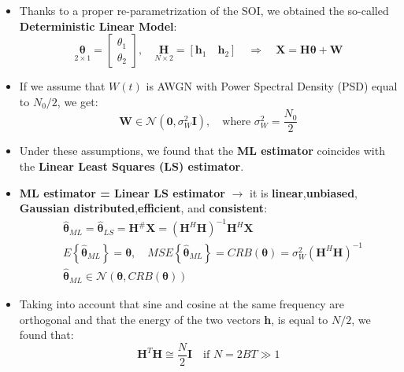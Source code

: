\begin{itemize}
\item Thanks to a proper re-parametrization of the SOI, we obtained the so-called \textbf{Deterministic Linear Model}:
$$\underset{2 \times 1}{\boldsymbol{\theta}} = \begin{bmatrix} \theta_{1} \\ \theta_{2} \end{bmatrix}, \quad \underset{N \times 2}{\mathbf{H}} = [\mathbf{h}_{1} \quad \mathbf{h}_{2}] \quad \Rightarrow \quad \mathbf{X} = \mathbf{H}\boldsymbol{\theta} + \mathbf{W}$$
\item If we assume that \(W(t)\) is AWGN with Power Spectral Density (PSD) equal to \(N_0/2\), we get:
$$\mathbf{W} \in \mathcal{N}(\mathbf{0}, \sigma_{W}^{2}\mathbf{I}), \quad \text{where } \sigma_{W}^{2} = \frac{N_{0}}{2}$$
\item Under these assumptions, we found that the \textbf{ML estimator} coincides with the \textbf{Linear Least Squares (LS) estimator}.

\item \textbf{ML estimator = Linear LS estimator} \(\rightarrow\) it is \textbf{linear},\textbf{unbiased}, \textbf{Gaussian distributed},\textbf{efficient}, and \textbf{consistent}:
\begin{align*}
&\hat{\boldsymbol{\theta}}_{ML} = \hat{\boldsymbol{\theta}}_{LS} = \mathbf{H}^{\#}\mathbf{X} = (\mathbf{H}^{H}\mathbf{H})^{-1}\mathbf{H}^{H}\mathbf{X} \\[1em]
&E\left\{\hat{\boldsymbol{\theta}}_{ML}\right\} = \boldsymbol{\theta}, \quad MSE\left\{\hat{\boldsymbol{\theta}}_{ML}\right\} = CRB(\boldsymbol{\theta}) = \sigma_{W}^{2}(\mathbf{H}^{H}\mathbf{H})^{-1} \\[1em]
&\hat{\boldsymbol{\theta}}_{ML} \in \mathcal{N}(\boldsymbol{\theta}, CRB(\boldsymbol{\theta}))
\end{align*}
\item Taking into account that sine and cosine at the same frequency are orthogonal and that the energy of the two vectors \textbf{h}, is equal to \(N/2\), we found that:
$$\mathbf{H}^{T}\mathbf{H} \cong \frac{N}{2}\mathbf{I} \quad \text{if } N = 2BT \gg 1$$




\end{itemize}
